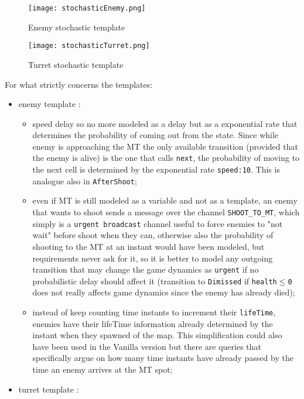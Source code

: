 \documentclass[
10pt, %
a4paper, %
oneside, %
headinclude,footinclude, %
BCOR5mm, %
]{scrartcl}
\begin{document}
\begin{figure}[h!]
	\centering
	\begin{minipage}{.6\textwidth}
		\centering
		\texttt{[image: stochasticEnemy.png]}
		\caption{Enemy stochastic template}
	\end{minipage}%
	\begin{minipage}{.4\textwidth}
		\centering
		\texttt{[image: stochasticTurret.png]}
		\caption{Turret stochastic template}
	\end{minipage}
\end{figure}

For what strictly concerns the templates:
\begin{itemize}
	\item enemy template :
		\begin{itemize}
			\item speed delay so no more modeled as a delay but as a exponential rate that determines the probability of coming out from the state. Since while enemy is approaching the MT the only available transition (provided that the enemy is alive) is the one that calls \texttt{next}, the probability of moving to the next cell is determined by the exponential rate \texttt{speed:10}. This is analogue also in \texttt{AfterShoot};
			\item even if MT is still modeled as a variable and not as a template, an enemy that wants to shoot sends a message over the channel \texttt{SHOOT\_TO\_MT}, which simply is a \texttt{urgent broadcast} channel useful to force enemies to "not wait" before shoot when they can, otherwise also the probability of shooting to the MT at an instant would have been modeled, but requirements never ask for it, so it is better to model any outgoing transition that may change the game dynamics as \texttt{urgent} if no probabilistic delay should affect it (transition to \texttt{Dimissed} if \texttt{health$\leq$0} does not really affects game dynamics since the enemy has already died);
			\item instead of keep counting time instants to increment their \texttt{lifeTime}, enemies have their lifeTime information already determined by the instant when they spawned of the map. This simplification could also have been used in the Vanilla version but there are queries that specifically argue on how many time instants have already passed by the time an enemy arrives at the MT spot;
		\end{itemize}
	\item turret template :

\end{itemize}
\end{document}
